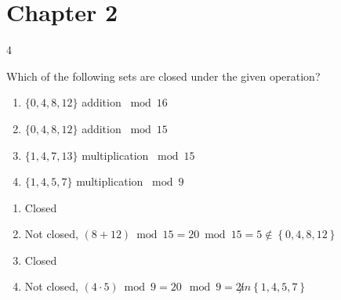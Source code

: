 \section*{Chapter 2}

\begin{hwproblem}
{4}{
    Which of the following sets are closed under the given operation?
    \begin{enumerate}[label=\textbf{\alph*.}]
        \item $\{0,4,8,12\}$ addition ${}\bmod 16$
        \item $\{0,4,8,12\}$ addition ${}\bmod 15$
        \item $\{1,4,7,13\}$ multiplication ${}\bmod 15$
        \item $\{1,4,5,7\}$ multiplication ${}\bmod 9$
    \end{enumerate}
}

\begin{enumerate}[label=\textbf{\alph*.}]
    \item Closed
    \item Not closed, \((8 + 12) \bmod 15 = 20 \bmod 15 = 5 \notin \left\{0, 4, 8, 12\right\}\)
    \item Closed
    \item Not closed, \((4 \cdot 5) \bmod 9 = 20 \mod 9 = 2 \not in \left\{1, 4, 5, 7\right\}\)
\end{enumerate}
\end{hwproblem}


